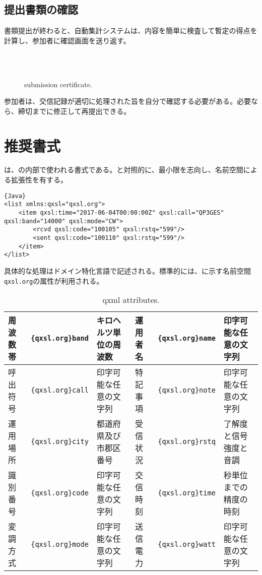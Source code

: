 \documentclass[10pt,a4paper]{book}
\begin{document}
\section{提出書類の確認}

書類提出が終わると、自動集計システムは、内容を簡単に検査して暫定の得点を計算し、参加者に確認画面を送り返す。

\begin{figure}[H]
\centering
{}\\
\\
\caption{submission certificate.}
\end{figure}

参加者は、交信記録が適切に処理された旨を自分で確認する必要がある。必要なら、締切までに修正して再提出できる。

\chapter{推奨書式}

\qxml{}は、の内部で使われる書式である。\adi{}と対照的に、最小限を志向し、名前空間による拡張性を有する。

\begin{Verbatim}{Java}
<list xmlns:qxsl="qxsl.org">
	<item qxsl:time="2017-06-04T00:00:00Z" qxsl:call="QP3GES" qxsl:band="14000" qxsl:mode="CW">
		<rcvd qxsl:code="100105" qxsl:rstq="599"/>
		<sent qxsl:code="100110" qxsl:rstq="599"/>
	</item>
</list>
\end{Verbatim}

具体的な処理はドメイン特化言語で記述される。標準的には、に示す名前空間\texttt{qxsl.org}の属性が利用される。

\begin{table}[H]
\centering
\caption{qxml attributes.\label{tab:qxml}}
\begin{tabular}{llllll} \toprule
周波数帯 & \verb|{qxsl.org}band| & キロヘルツ単位の周波数 & 運用者名 & \verb|{qxsl.org}name| & 印字可能な任意の文字列 \\ \midrule
呼出符号 & \verb|{qxsl.org}call| & 印字可能な任意の文字列 & 特記事項 & \verb|{qxsl.org}note| & 印字可能な任意の文字列 \\ \midrule
運用場所 & \verb|{qxsl.org}city| & 都道府県及び市郡区番号 & 受信状況 & \verb|{qxsl.org}rstq| & 了解度と信号強度と音調 \\ \midrule
識別番号 & \verb|{qxsl.org}code| & 印字可能な任意の文字列 & 交信時刻 & \verb|{qxsl.org}time| & 秒単位までの精度の時刻 \\ \midrule
変調方式 & \verb|{qxsl.org}mode| & 印字可能な任意の文字列 & 送信電力 & \verb|{qxsl.org}watt| & 印字可能な任意の文字列 \\ \bottomrule
\end{tabular}
\end{table}
\end{document}
